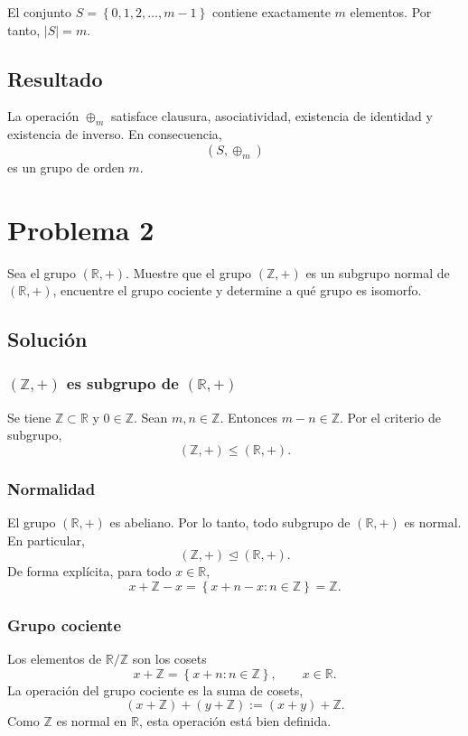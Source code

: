 \documentclass[11pt,a4paper]{article}
\newcommand{\R}{\mathbb{R}}
\newcommand{\Z}{\mathbb{Z}}
\newcommand{\set}[1]{\left\{#1\right\}}
\begin{document}
El conjunto $S=\set{0,1,2,\ldots,m-1}$ contiene exactamente $m$ elementos. Por tanto, $|S|=m$.

\subsection*{Resultado}

La operación $\oplus_m$ satisface clausura, asociatividad, existencia de identidad y existencia de inverso. En consecuencia,
\[
(S,\oplus_m)
\]
es un grupo de orden $m$.

\newpage
\section*{Problema 2}

Sea el grupo $(\R,+)$. Muestre que el grupo $(\Z,+)$ es un subgrupo normal de $(\R,+)$, encuentre el grupo cociente y determine a qué grupo es isomorfo.

\subsection*{Solución}

\subsubsection*{$(\Z,+)$ es subgrupo de $(\R,+)$}

Se tiene $\Z\subset\R$ y $0\in\Z$. Sean $m,n\in\Z$. Entonces $m-n\in\Z$. Por el criterio de subgrupo,
\[
(\Z,+)\leq(\R,+).
\]

\subsubsection*{Normalidad}

El grupo $(\R,+)$ es abeliano. Por lo tanto, todo subgrupo de $(\R,+)$ es normal. En particular,
\[
(\Z,+)\trianglelefteq(\R,+).
\]
De forma explícita, para todo $x\in\R$,
\[
x+\Z-x=\set{x+n-x:n\in\Z}=\Z.
\]

\subsubsection*{Grupo cociente}

Los elementos de $\R/\Z$ son los cosets
\[
x+\Z=\set{x+n:n\in\Z},\qquad x\in\R.
\]
La operación del grupo cociente es la suma de cosets,
\[
(x+\Z)+(y+\Z):=(x+y)+\Z.
\]
Como $\Z$ es normal en $\R$, esta operación está bien definida.
\end{document}

